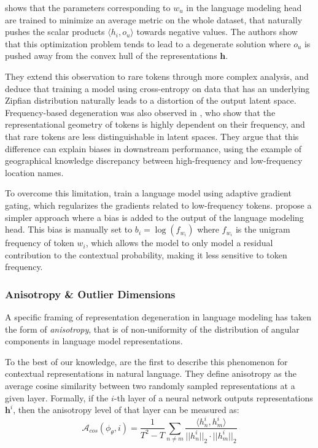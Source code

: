  shows that the parameters corresponding to $w_u$ in the language modeling head are trained to minimize an average metric on the whole dataset, that naturally pushes the scalar products $\langle h_i, o_u \rangle$ towards negative values. The authors show that this optimization problem tends to lead to a degenerate solution where $o_u$ is pushed away from the convex hull of the representations $\mathbf{h}$.

They extend this observation to rare tokens through more complex analysis, and deduce that training a model using cross-entropy on data that has an underlying Zipfian distribution naturally leads to a distortion of the output latent space. Frequency-based degeneration was also observed in \citet{zhou2021frequencybaseddistortionscontextualizedword}, who show that the representational geometry of tokens is highly dependent on their frequency, and that rare tokens are less distinguishable in latent spaces. They argue that this difference can explain biases in downstream performance, using the example of geographical knowledge discrepancy between high-frequency and low-frequency location names.

To overcome this limitation, \citet{yu-etal-2022-rare} train a language model using adaptive gradient gating, which regularizes the gradients related to low-frequency tokens. \citet{meister-etal-2023-natural} propose a simpler approach where a bias is added to the output of the language modeling head. This bias is manually set to $b_i = \log(f_{w_i})$ where $f_{w_i}$ is the unigram frequency of token $w_i$, which allows the model to only model a residual contribution to the contextual probability, making it less sensitive to token frequency.

\subsubsection{Anisotropy \& Outlier Dimensions}

A specific framing of representation degeneration in language modeling has taken the form of \textit{anisotropy}, that is of non-uniformity of the distribution of angular components in language model representations. 

To the best of our knowledge, \citet{ethayarajh-2019-contextual} are the first to describe this phenomenon for contextual representations in natural language. They define anisotropy as the average cosine similarity between two randomly sampled representations at a given layer. Formally, if the $i$-th layer of a neural network outputs representations $\mathbf{h}^i$, then the anisotropy level of that layer can be measured as:
\begin{equation}
    \label{eq:anisotropy_cos_def}
    \mathcal{A}_{cos}(\phi_\theta, i) = \frac{1}{T^2 - T} \sum_{n \neq m} \frac{\langle h^i_n, h^i_m \rangle}{||h^i_n||_2 \cdot||h^i_m||_2 }
\end{equation}

